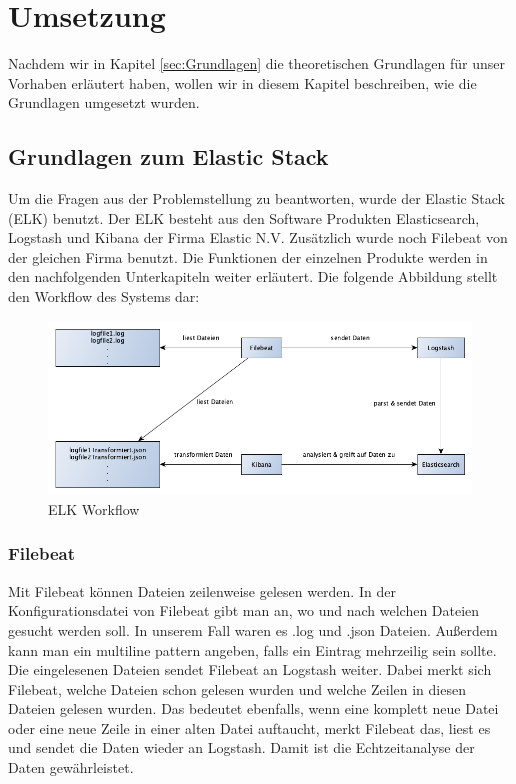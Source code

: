 \section{Umsetzung}
\label{sec:Umsetzung}
Nachdem wir in Kapitel \ref{sec:Grundlagen} die theoretischen Grundlagen für unser Vorhaben erläutert haben, wollen wir in diesem Kapitel beschreiben, wie die Grundlagen umgesetzt wurden.

\subsection{Grundlagen zum Elastic Stack}
\label{sub:Grundlagen zum Elastic Stack}
Um die Fragen aus der Problemstellung zu beantworten, wurde der Elastic Stack (ELK) benutzt. Der ELK besteht aus den Software Produkten Elasticsearch, Logstash und Kibana der Firma Elastic N.V. Zusätzlich wurde noch Filebeat von der gleichen Firma benutzt. Die Funktionen der einzelnen Produkte werden in den nachfolgenden Unterkapiteln weiter erläutert. Die folgende Abbildung stellt den Workflow des Systems dar:

\begin{figure}[htb]
\begin{center}
	\includegraphics[width=440pt]{bilder/workflow.png}
\end{center}
\caption{ELK Workflow}
\label{fig:elk_workflow}
\end{figure}


\subsubsection{Filebeat}
\label{ssub:Filebeat}
Mit Filebeat können Dateien zeilenweise gelesen werden. In der Konfigurationsdatei von Filebeat gibt man an, wo und nach welchen Dateien gesucht werden soll. In unserem Fall waren es .log und .json Dateien. Außerdem kann man ein multiline pattern angeben, falls ein Eintrag mehrzeilig sein sollte. Die eingelesenen Dateien sendet Filebeat an Logstash weiter. Dabei merkt sich Filebeat, welche Dateien schon gelesen wurden und welche Zeilen in diesen Dateien gelesen wurden. Das bedeutet ebenfalls, wenn eine komplett neue Datei oder eine neue Zeile in einer alten Datei auftaucht, merkt Filebeat das, liest es und sendet die Daten wieder an Logstash. Damit ist die Echtzeitanalyse der Daten gewährleistet. 

